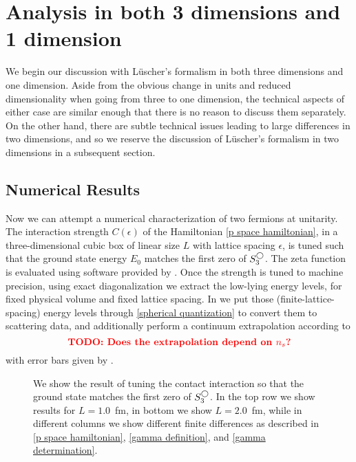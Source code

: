 \section{Analysis in both 3 dimensions and 1 dimension}
We begin our discussion with L\"uscher's formalism in both three dimensions and one dimension.  Aside from the obvious change in units and reduced dimensionality when going from three to one dimension, the technical aspects of either case are similar enough that there is no reason to discuss them separately.  On the other hand, there are subtle technical issues leading to large differences in two dimensions, and so we reserve the discussion of L\"uscher's formalism in two dimensions in a subsequent section.


\subsection{Numerical Results}

Now we can attempt a numerical characterization of {\color{red} two} fermions at unitarity.
The interaction strength $C(\epsilon)$ of the Hamiltonian \eqref{p space hamiltonian}, in a three-dimensional cubic box of linear size $L$ with lattice spacing $\epsilon$, is tuned such that the ground state energy $E_0$ matches the first zero of $S^{\bigcirc}_3$.
The zeta function is evaluated using software provided by .
Once the strength is tuned to machine precision, using exact diagonalization we extract the low-lying energy levels, for fixed physical volume and fixed lattice spacing.
In  we put those (finite-lattice-spacing) energy levels through \eqref{spherical quantization} to convert them to scattering data, and additionally perform a continuum extrapolation according to
\begin{equation}
    \text{{\bf\color{red}TODO: Does the extrapolation depend on \ensuremath{{n_s}}?}}
\end{equation}
with error bars given by .  

\begin{figure}[th]
    
    \caption{We show the result of tuning the contact interaction so that the ground state matches the first zero of $S^{\bigcirc}_3$.  In the top row we show results for $L=1.0$~fm, in bottom we show $L=2.0$~fm, while in different columns we show different finite differences as described in \eqref{p space hamiltonian}, \eqref{gamma definition}, and \eqref{gamma determination}. }
    \label{fig:unimproved spherical}
\end{figure}

